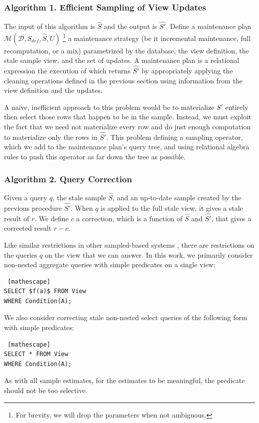 \subsubsection{Algorithm 1. Efficient Sampling of View Updates}
The input of this algorithm is $\hat{S}$ and the output is $\hat{S'}$.
Define a maintenance plan $\mathcal{M}(\mathcal{D},S_{def},\hat{S},U)$ \footnote{For brevity, we will drop the parameters when not ambiguous.} a maintenance strategy (be it incremental maintenance, full recomputation, or a mix) parametrized by the database, the view definition, the stale sample view, and the set of updates.
A maintenance plan is a relational expression the execution of which returns $\hat{S'}$ by appropriately applying the cleaning operations defined in the previous section using information from the view definition and the updates.

A naive, inefficient approach to this problem would be to materialize $S'$ entirely then select those rows that happen to be in the sample.
Instead, we must exploit the fact that we need not materialize every row and do just enough computation to materialize only the rows in $\hat{S'}$.
This problem defining a sampling operator, which we add to the maintenance plan's query tree, and using relational algebra rules to push this operator as far down the tree as possible.

\subsubsection{Algorithm 2. Query Correction }
Given a query $q$, the stale sample $\hat{S}$, and an up-to-date sample created by the previous procedure $\hat{S'}$.
When $q$ is applied to the full stale view, it gives a stale result of $r$.
We define $c$ a correction, which is a function of $\hat{S}$ and $\hat{S'}$, that gives a corrected result $r-c$.

Like similar restrictions in other sampled-based systems \cite{agarwalknowing}, there are restrictions on the queries $q$ on the view that we can answer. 
In this work, we primarily consider non-nested aggregate queries with simple predicates on a single view:
\begin{lstlisting} [mathescape]
SELECT $f(a)$ FROM View 
WHERE Condition(A);
\end{lstlisting}
We also consider correcting stale non-nested select queries of the following form with simple predicates:
\begin{lstlisting} [mathescape]
SELECT * FROM View 
WHERE Condition(A);
\end{lstlisting}
As with all sample estimates, for the estimates to be meaningful, the predicate should not be too selective.

